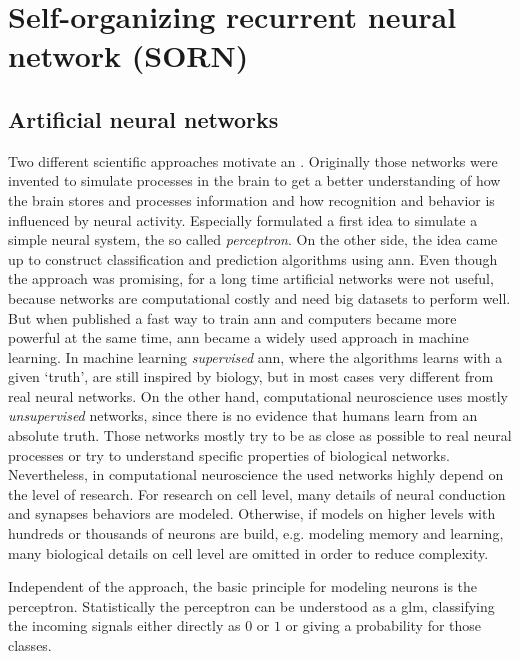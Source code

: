 \section{Self-organizing recurrent neural network (SORN)}
\label{sec:nn}

\subsection{Artificial neural networks}
\label{sec:ann}

Two different scientific approaches motivate an . Originally those networks were invented to simulate processes in the brain to get a better understanding of how the brain stores and processes information and how recognition and behavior is influenced by neural activity. Especially \textcite{rosenblatt1958perceptron} formulated a first idea to simulate a simple neural system, the so called \emph{perceptron}. On the other side, the idea came up to construct classification and prediction algorithms using \acs{ann}. Even though the approach was promising, for a long time artificial networks were not useful, because networks are computational costly and need big datasets to perform well. But when \textcite{hinton2006fast} published a fast way to train \acs{ann} and computers became more powerful at the same time, \acs{ann} became a widely used approach in machine learning. In machine learning \emph{supervised} \acs{ann}, where the algorithms learns with a given `truth', are still inspired by biology, but in most cases very different from real neural networks. On the other hand, computational neuroscience uses mostly \emph{unsupervised} networks, since there is no evidence that humans learn from an absolute truth. Those networks mostly try to be as close as possible to real neural processes or try to understand specific properties of biological networks. Nevertheless, in computational neuroscience the used networks highly depend on the level of research. For research on cell level, many details of neural conduction and synapses behaviors are modeled. Otherwise, if models on higher levels with hundreds or thousands of neurons are build, e.g. modeling memory and learning, many biological details on cell level are omitted in order to reduce complexity.

Independent of the approach, the basic principle for modeling neurons is the perceptron. Statistically the perceptron can be understood as a \ac{glm}, classifying the incoming signals either directly as $0$ or $1$ or giving a probability for those classes.

